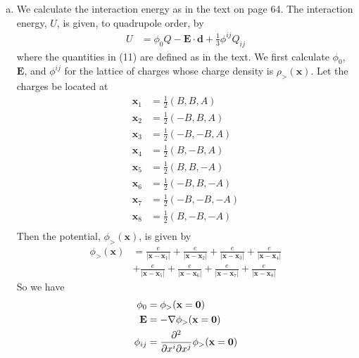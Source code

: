\documentclass[]{article}
\begin{document}
\begin{enumerate}[a)]
\item We calculate the interaction energy as in the text on page 64. The interaction energy, $U$, is given, to quadrupole order, by
\begin{equation}
\begin{split}
U & = \phi_0 Q- \textbf{E}\cdot\textbf{d} + \frac{1}{3}\phi^{ij}Q_{ij}
\end{split}
\end{equation}
where the quantities in (11) are defined as in the text. We first calculate $\phi_0$, $\textbf{E}$, and $\phi^{ij}$ for the lattice of charges whose charge density is $\rho_>(\textbf{x})$. Let the charges be located at 
\begin{equation}
\begin{split}
\textbf{x}_1 & =\frac{1}{2}(B,B,A) \\
\textbf{x}_2 & =\frac{1}{2}(-B,B,A) \\
\textbf{x}_3 & =\frac{1}{2}(-B,-B,A) \\
\textbf{x}_4 & =\frac{1}{2}(B,-B,A) \\
\textbf{x}_5 & =\frac{1}{2}(B,B,-A) \\
\textbf{x}_6 & =\frac{1}{2}(-B,B,-A) \\
\textbf{x}_7 & =\frac{1}{2}(-B,-B,-A) \\
\textbf{x}_8 & =\frac{1}{2}(B,-B,-A) \\
\end{split}
\end{equation}
Then the potential, $\phi_>(\textbf{x})$, is given by
\begin{equation}
\begin{split}
\phi_>(\textbf{x}) & = \frac{e}{|\textbf{x} - \textbf{x}_1|} + \frac{e}{|\textbf{x} - \textbf{x}_2|}  +\frac{e}{|\textbf{x} - \textbf{x}_3|} +\frac{e}{|\textbf{x} - \textbf{x}_4|} \\ &+\frac{e}{|\textbf{x} - \textbf{x}_5|} +\frac{e}{|\textbf{x} - \textbf{x}_6|} +\frac{e}{|\textbf{x} - \textbf{x}_7|} +\frac{e}{|\textbf{x} - \textbf{x}_8|}
\end{split}
\end{equation}
So we have
\begin{equation}
\begin{split}
\phi_0 & = \phi_>(\textbf{x} = \textbf{0}) \\
\textbf{E} & = -\nabla \phi_>(\textbf{x} = \textbf{0}) \\
\phi_{ij} & = \pdv{}{x^i}{x^j}\phi_>(\textbf{x} = \textbf{0}) \\

\end{split}
\end{equation}
\end{enumerate}
\end{document}
